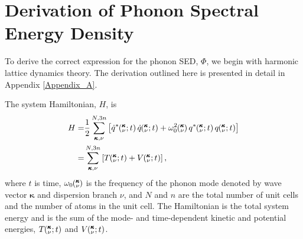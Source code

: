 \documentclass[letterpaper,12pt]{article}
\newcommand{\SUM}[2]{\ifthenelse{\equal{#1}{0}}{\sum_{\alpha_{#2},b_{#2},l_{#2}}^{3,n,N}} {\ifthenelse{\equal{#1}{1}}{\sum_{\alpha_{#2},b_{#2}}^{3,n}}{\sum_{\pmb{\kappa}#2,\nu#2}^{N,3n}}}}
\newcommand{\kvt}{\mspace{-4.0mu}\left(\mspace{-8.0mu}\begin{smallmatrix}&\pmb{\kappa} \\&\nu\end{smallmatrix}\mspace{-2.0mu};t\right)}
\newcommand{\kv}{\mspace{-4.0mu}\left(\mspace{-8.0mu}\begin{smallmatrix}&\pmb{\kappa} \\&\nu\end{smallmatrix}\mspace{-3.0mu}\right)}
\begin{document}
%

\section{\label{Appendix_A}Derivation of Phonon Spectral Energy Density}

To derive the correct expression for the phonon SED, $\Phi$, we begin with harmonic lattice dynamics theory.\cite{wallace1972,dove1993} The derivation outlined here is presented in detail in Appendix \ref{Appendix_A}.




The system Hamiltonian, $H$, is\cite{dove1993}
\begin{equation}\label{E:H_HLD}
\begin{split}
H=&\frac{1}{2}\SUM{}{}\left[\dot{q}^*\kvt \dot{q}\kvt + \omega_0^2\kv q^*\kvt q\kvt\right]\\
 =&\SUM{}{}\left[T\kvt + V\kvt\right],
 \end{split}
\end{equation}
where $t$ is time, $\omega_0\kv$ is the frequency of the phonon mode denoted by
wave vector $\pmb{\kappa}$ and dispersion branch $\nu$, and $N$ and $n$ are
the total number of unit cells and the number of atoms in the unit cell.  The
Hamiltonian is the total system energy and is the sum of the mode- and
time-dependent kinetic and potential energies, $T\kvt$ and $V\kvt$.
\end{document}
